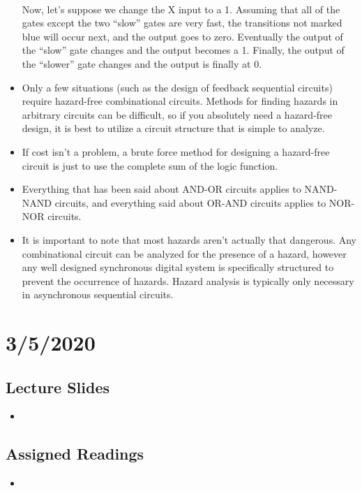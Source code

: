 \documentclass[10pt,a4paper]{article}
\begin{document}
\begin{itemize}
\\
Now, let's suppose we change the X input to a 1. Assuming that all of the gates except the two ``slow'' gates are very fast, the transitions not marked blue will occur next, and the output goes to zero. Eventually the output of the ``slow'' gate changes and the output becomes a 1. Finally, the output of the ``slower'' gate changes and the output is finally at 0. 
\item Only a few situations (such as the design of feedback sequential circuits) require hazard-free combinational circuits. Methods for finding hazards in arbitrary circuits can be difficult, so if you absolutely need a hazard-free design, it is best to utilize a circuit structure that is simple to analyze. 
\item If cost isn't a problem, a brute force method for designing a hazard-free circuit is just to use the complete sum of the logic function. 
\item Everything that has been said about AND-OR circuits applies to NAND-NAND circuits, and everything said about OR-AND circuits applies to NOR-NOR circuits.
\item It is important to note that most hazards aren't actually that dangerous. Any combinational circuit can be analyzed for the presence of a hazard, however any well designed synchronous digital system is specifically structured to prevent the occurrence of hazards. Hazard analysis is typically only necessary in asynchronous sequential circuits. 
\end{itemize}
\pagebreak
\section{3/5/2020}
\subsection{Lecture Slides}
\begin{itemize}
\item
\end{itemize}
\subsection{Assigned Readings}
\begin{itemize}
\item 
\end{itemize}
\end{document}
